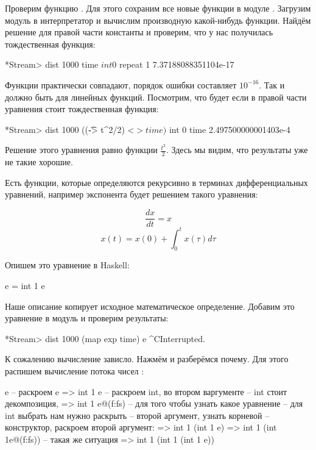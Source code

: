 
Проверим функцию . Для этого сохраним все новые
функции в модуле . Загрузим модуль в интерпретатор и 
вычислим производную какой-нибудь функции. Найдём решение 
для правой части константы и проверим, что у нас получилась
тождественная функция:

\begin{code}
*Stream> dist 1000 time $ int 0 $ repeat 1
7.37188088351104e-17
\end{code}

Функции практически совпадают, порядок ошибки составляет
$10^{-16}$. Так и должно быть для линейных функций. 
Посмотрим, что будет если в правой части уравнения 
стоит тождественная функция:

\begin{code}
*Stream> dist 1000 ((\t -> t^2/2) <$> time) $ int 0 time
2.497500000001403e-4
\end{code}

Решение этого уравнения равно функции $$. 
Здесь мы видим, что результаты уже не такие хорошие.

Есть функции, которые определяются рекурсивно 
в терминах дифференциальных уравнений, например 
экспонента будет решением такого уравнения:

\[ \frac{dx}{dt} = x \]
\[ x(t) = x(0) + \int_{0}^{t} x(\tau) d \tau \]

Опишем это уравнение в Haskell:


\begin{code}
e = int 1 e
\end{code}

Наше описание копирует исходное математическое
определение. Добавим это уравнение в модуль  
и проверим результаты:

\begin{code}
*Stream> dist 1000 (map exp time) e
^CInterrupted.
\end{code}

К сожалению вычисление зависло. Нажмём  и 
разберёмся почему. Для этого распишем вычисление потока чисел :


\begin{code}
        e                           -- раскроем e 
=>      int 1 e                     -- раскроем int, во втором варгументе
                                    -- int стоит декомпозиция, 
=>      int 1 e@(f:fs)              -- для того чтобы узнать какое уравнение 
                                    -- для int выбрать нам нужно раскрыть 
                                    -- второй аргумент, узнать корневой 
                                    -- конструктор, раскроем второй аргумент:
=>      int 1 (int 1 e)
=>      int 1 (int 1e@(f:fs))       -- такая же ситуация
=>      int 1 (int 1 (int 1 e))
\end{code}

